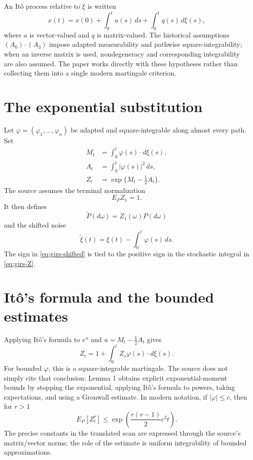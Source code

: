 An It\^o process relative to \(\xi\) is written
\begin{equation}\label{eq:girs-ito}
 x(t)=x(0)+\int_0^t a(s)\,ds+\int_0^t q(s)\,d\xi(s),
\end{equation}
where \(a\) is vector-valued and \(q\) is matrix-valued.  The historical assumptions
\((A_0)\)--\((A_3)\) impose adapted measurability and pathwise square-integrability; when an
inverse matrix is used, nondegeneracy and corresponding integrability are also assumed.  The paper
works directly with these hypotheses rather than collecting them into a single modern martingale
criterion.

\section{The exponential substitution}
Let \(\varphi=(\varphi_1,\dots,\varphi_n)\) be adapted and square-integrable along almost every
path.  Set
\begin{align}
 M_t&=\int_0^t\varphi(s)\cdot d\xi(s),\label{eq:girs-M}\\
 A_t&=\int_0^t|\varphi(s)|^2\,ds,\label{eq:girs-A}\\
 Z_t&=\exp\{M_t-\tfrac12A_t\}.\label{eq:girs-Z}
\end{align}
The source assumes the terminal normalization
\begin{equation}\label{eq:girs-normalization}
 E_P Z_1=1.
\end{equation}
It then defines
\[
 \widetilde P(d\omega)=Z_1(\omega)P(d\omega)
\]
and the shifted noise
\begin{equation}\label{eq:girs-shifted}
 \widetilde\xi(t)=\xi(t)-\int_0^t\varphi(s)\,ds.
\end{equation}
The sign in \eqref{eq:girs-shifted} is tied to the positive sign in the stochastic integral in
\eqref{eq:girs-Z}.

\section{It\^o's formula and the bounded estimates}
Applying It\^o's formula to \(e^u\) and \(u=M_t-\tfrac12A_t\) gives
\begin{equation}\label{eq:girs-dZ}
 Z_t=1+\int_0^t Z_s\varphi(s)\cdot d\xi(s).
\end{equation}
For bounded \(\varphi\), this is a square-integrable martingale.  The source does not simply cite
that conclusion: Lemma 1 obtains explicit exponential-moment bounds by stopping the exponential,
applying It\^o's formula to powers, taking expectations, and using a Gronwall estimate.  In modern
notation, if \(|\varphi|\le c\), then for \(r>1\)
\[
 E_P[Z_t^r]
 \le \exp\!\left(\frac{r(r-1)}2c^2t\right).
\]
The precise constants in the translated scan are expressed through the source's matrix/vector norms;
the role of the estimate is uniform integrability of bounded approximations.

